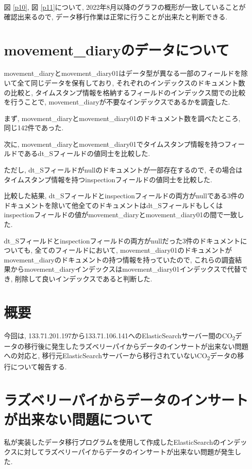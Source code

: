 図 \ref{p10}, 図 \ref{p11}について, 2022年8月以降のグラフの概形が一致していることが確認出来るので, データ移行作業は正常に行うことが出来たと判断できる.

\section{movement\_diaryのデータについて}
movement\_diaryとmovement\_diary01はデータ型が異なる一部のフィールドを除いて全て同じデータを保有しており, それぞれのインデックスのドキュメント数の比較と, タイムスタンプ情報を格納するフィールドのインデックス間での比較を行うことで, movement\_diaryが不要なインデックスであるかを調査した.

まず, movement\_diaryとmovement\_diary01のドキュメント数を調べたところ, 同じ142件であった.

次に, movement\_diaryとmovement\_diary01でタイムスタンプ情報を持つフィールドであるdt\_Sフィールドの値同士を比較した.

ただし, dt\_Sフィールドがnullのドキュメントが一部存在するので, その場合はタイムスタンプ情報を持つinspectionフィールドの値同士を比較した.

比較した結果, dt\_Sフィールドとinspectionフィールドの両方がnullである3件のドキュメントを除いて他全てのドキュメントはdt\_Sフィールドもしくはinspectionフィールドの値がmovement\_diaryとmovement\_diary01の間で一致した.

dt\_Sフィールドとinspectionフィールドの両方がnullだった3件のドキュメントについても, 全てのフィールドにおいて, movement\_diary01のドキュメントがmovement\_diaryのドキュメントの持つ情報を持っていたので, これらの調査結果からmovement\_diaryインデックスはmovement\_diary01インデックスで代替でき, 削除して良いインデックスであると判断した.


\section{概要}
今回は, 133.71.201.197から133.71.106.141へのElasticSearchサーバー間のCO\textsubscript{2}データの移行後に発生したラズベリーパイからデータのインサートが出来ない問題への対応と, 移行元ElasticSearchサーバーから移行されていないCO\textsubscript{2}データの移行について報告する.

\section{ラズベリーパイからデータのインサートが出来ない問題について}

私が実装したデータ移行プログラムを使用して作成したElasticSearchのインデックスに対してラズベリーパイからデータのインサートが出来ない問題が発生した.

